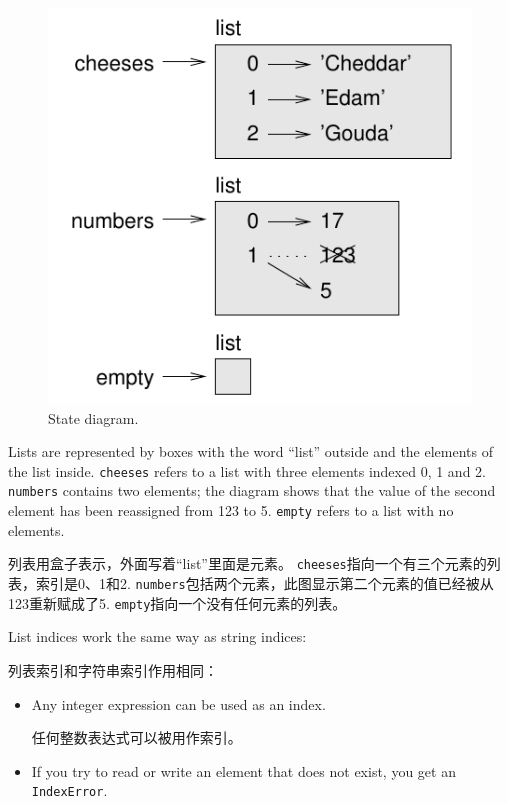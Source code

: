 \documentclass[10pt]{book}
\begin{document}
\begin{CJK}{UTF8}{gbsn}
\begin{figure}
\centerline
{\includegraphics[scale=0.8]{figs/liststate.pdf}}
\caption{State diagram.}
\label{fig.liststate}
\end{figure}

Lists are represented by boxes with the word ``list'' outside
and the elements of the list inside.  {\tt cheeses} refers to
a list with three elements indexed 0, 1 and 2.
{\tt numbers} contains two elements; the diagram shows that the
value of the second element has been reassigned from 123 to 5.
{\tt empty} refers to a list with no elements.

列表用盒子表示，外面写着``list''里面是元素。
{\tt cheeses}指向一个有三个元素的列表，索引是0、1和2.
{\tt numbers}包括两个元素，此图显示第二个元素的值已经被从123重新赋成了5.
{\tt empty}指向一个没有任何元素的列表。

List indices work the same way as string indices:

列表索引和字符串索引作用相同：

\begin{itemize}

\item Any integer expression can be used as an index.

任何整数表达式可以被用作索引。

\item If you try to read or write an element that does not exist, you
get an {\tt IndexError}.


\end{itemize}
\end{CJK}
\end{document}
